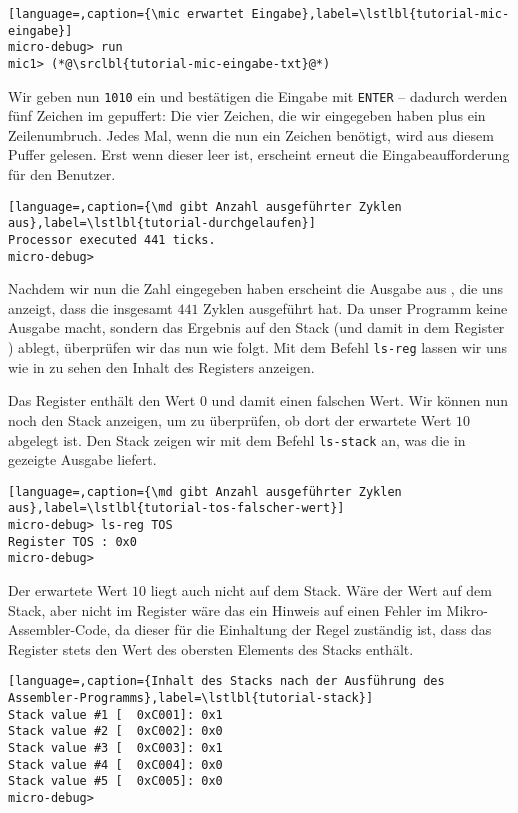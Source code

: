 \begin{lstlisting}[language=,caption={\mic erwartet Eingabe},label=\lstlbl{tutorial-mic-eingabe}]
micro-debug> run
mic1> (*@\srclbl{tutorial-mic-eingabe-txt}@*)
\end{lstlisting}

Wir geben nun \texttt{1010} ein und bestätigen die Eingabe mit \texttt{ENTER} -- dadurch werden fünf Zeichen im \md gepuffert: Die vier Zeichen, die wir eingegeben haben plus ein Zeilenumbruch. Jedes Mal, wenn die \mic nun ein Zeichen benötigt, wird aus diesem Puffer gelesen. Erst wenn dieser leer ist, erscheint erneut die Eingabeaufforderung für den Benutzer.

\begin{lstlisting}[language=,caption={\md gibt Anzahl ausgeführter Zyklen aus},label=\lstlbl{tutorial-durchgelaufen}]
Processor executed 441 ticks.
micro-debug> 
\end{lstlisting}

Nachdem wir nun die Zahl eingegeben haben erscheint die Ausgabe aus , die uns anzeigt, dass die \mic insgesamt $441$ Zyklen ausgeführt hat. Da unser Programm keine Ausgabe macht, sondern das Ergebnis auf den Stack (und damit in dem Register ) ablegt, überprüfen wir das nun wie folgt. Mit dem Befehl \texttt{ls-reg} lassen wir uns wie in  zu sehen den Inhalt des Registers  anzeigen.

Das Register  enthält den Wert $0$ und damit einen falschen Wert. Wir können nun noch den Stack anzeigen, um zu überprüfen, ob dort der erwartete Wert $10$ abgelegt ist. Den Stack zeigen wir mit dem Befehl \texttt{ls-stack} an, was die in  gezeigte Ausgabe liefert.

\begin{lstlisting}[language=,caption={\md gibt Anzahl ausgeführter Zyklen aus},label=\lstlbl{tutorial-tos-falscher-wert}]
micro-debug> ls-reg TOS
Register TOS : 0x0
micro-debug> 
\end{lstlisting}

Der erwartete Wert $10$ liegt auch nicht auf dem Stack. Wäre der Wert auf dem Stack, aber nicht im Register  wäre das ein Hinweis auf einen Fehler im Mikro-Assembler-Code, da dieser für die Einhaltung der Regel zuständig ist, dass das Register  stets den Wert des obersten Elements des Stacks enthält.

\begin{lstlisting}[language=,caption={Inhalt des Stacks nach der Ausführung des Assembler-Programms},label=\lstlbl{tutorial-stack}]
Stack value #1 [  0xC001]: 0x1
Stack value #2 [  0xC002]: 0x0
Stack value #3 [  0xC003]: 0x1
Stack value #4 [  0xC004]: 0x0
Stack value #5 [  0xC005]: 0x0
micro-debug> 
\end{lstlisting}

